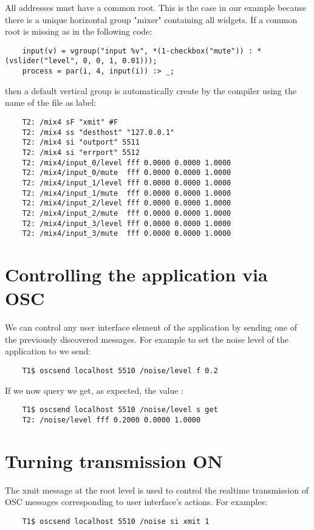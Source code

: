 All addresses must have a common root. This is the case in our example because there is a unique horizontal group "mixer" containing all widgets. If a common root is missing as in the following code:
\begin{lstlisting}
	input(v) = vgroup("input %v", *(1-checkbox("mute")) : *(vslider("level", 0, 0, 1, 0.01)));
	process = par(i, 4, input(i)) :> _;
\end{lstlisting}
then a default vertical group is automatically create by the \faust compiler using the name of the file  as label:
\begin{lstlisting}
	T2: /mix4 sF "xmit" #F
	T2: /mix4 ss "desthost" "127.0.0.1"
	T2: /mix4 si "outport" 5511
	T2: /mix4 si "errport" 5512
	T2: /mix4/input_0/level fff 0.0000 0.0000 1.0000
	T2: /mix4/input_0/mute  fff 0.0000 0.0000 1.0000
	T2: /mix4/input_1/level fff 0.0000 0.0000 1.0000
	T2: /mix4/input_1/mute  fff 0.0000 0.0000 1.0000
	T2: /mix4/input_2/level fff 0.0000 0.0000 1.0000
	T2: /mix4/input_2/mute  fff 0.0000 0.0000 1.0000
	T2: /mix4/input_3/level fff 0.0000 0.0000 1.0000
	T2: /mix4/input_3/mute  fff 0.0000 0.0000 1.0000
\end{lstlisting}

 
\section{Controlling the application via OSC}

We can control any user interface element of the application by sending one of the previously discovered messages. For example to set the noise level of the application to  we send:
\begin{lstlisting}
	T1$ oscsend localhost 5510 /noise/level f 0.2
\end{lstlisting}
	
If we now query  we get, as expected, the value :
\begin{lstlisting}
	T1$ oscsend localhost 5510 /noise/level s get
	T2: /noise/level fff 0.2000 0.0000 1.0000
\end{lstlisting}


\section{Turning transmission ON}
The xmit message at the root level is used to control the realtime transmission of OSC messages corresponding to user interface's actions. For examples:
\begin{lstlisting}
	T1$ oscsend localhost 5510 /noise si xmit 1
\end{lstlisting}

